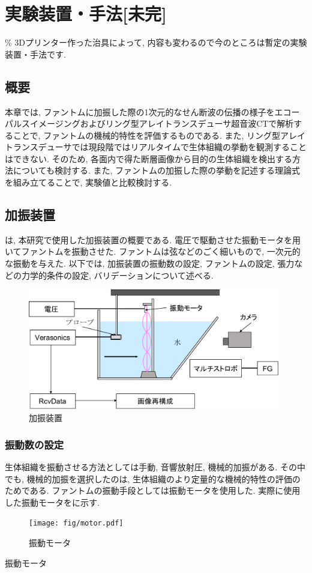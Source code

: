 \chapter{実験装置・手法[未完]\label{devicesection}}
\% 3Dプリンター作った治具によって, 内容も変わるので今のところは暫定の実験装置・手法です. 
\newpage
\section{概要}
本章では, ファントムに加振した際の1次元的なせん断波の伝播の様子をエコーパルスイメージングおよびリング型アレイトランスデューサ超音波CTで解析することで, ファントムの機械的特性を評価するものである. また, リング型アレイトランスデューサでは現段階ではリアルタイムで生体組織の挙動を観測することはできない. そのため, 各面内で得た断層画像から目的の生体組織を検出する方法についても検討する. また, ファントムの加振した際の挙動を記述する理論式を組み立てることで, 実験値と比較検討する.
\section{加振装置}
は, 本研究で使用した加振装置の概要である. 電圧で駆動させた振動モータを用いてファントムを振動させた. ファントムは弦などのごく細いもので, 一次元的な振動を与えた. 以下では, 加振装置の振動数の設定, ファントムの設定, 張力などの力学的条件の設定, バリデーションについて述べる. 
\begin{figure}[H]
  \begin{center}
    \includegraphics[width=110mm]{fig/jikkendevice.pdf}
  \end{center}
  \caption{加振装置}
\end{figure}
\subsection{振動数の設定}
生体組織を振動させる方法としては手動, 音響放射圧, 機械的加振がある. その中でも, 機械的加振を選択したのは, 生体組織のより定量的な機械的特性の評価のためである. ファントムの振動手段としては振動モータを使用した. 実際に使用した振動モータをに示す.
\begin{figure}[H]
  \begin{center}
    \texttt{[image: fig/motor.pdf]}
  \end{center}
  \caption{振動モータ}
\end{figure}
振動モータ
